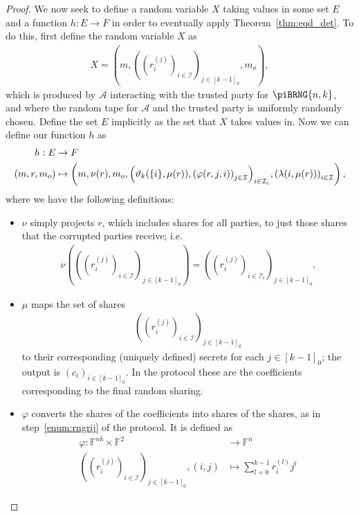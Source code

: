 \documentclass{article}
\newcommand{\seqZ}[1]{\left[#1\right]_0}
\theoremstyle{remark}
\newcommand{\F}{\mathbb{F}}
\begin{document}
\begin{proof}
	We now seek to define a random variable $X$ taking values in some set $E$
	and a function $h: E \to F$ in order to eventually apply
	Theorem~\ref{thm:eqd_det}. To do this, first define the random variable $X$
	as
	\begin{align*}
		X =
		\left(
			m,
			{\left(
				{\left(r_i^{(j)}\right)}_{i \in \mathcal{I}}
			\right)}_{j \in \seqZ{k-1}},
			m_o
		\right),
	\end{align*}
	which is produced by $\mathcal{A}$ interacting with the trusted party for
	$\piBRNG{n,k}$, and where the random tape for $\mathcal{A}$ and the trusted
	party is uniformly randomly chosen. Define the set $E$ implicitly as the
	set that $X$ takes values in. Now we can define our function $h$ as
	\begin{align*}
		\begin{aligned}
			h: E &\to F\\
			\left(
				m,
				r,
				m_o
			\right)
			&\mapsto
			\left(
				m,
				\nu(r),
				m_o,
				{\left(
					\vartheta_{k}(\{i\}, \mu(r)),
					{\left(\varphi(r, j, i)\right)}_{j \in \mathcal{I}}
				\right)}_{i \in \mathcal{I}_c},
				{\left(\lambda(i, \mu(r))\right)}_{i \in \mathcal{I}}
			\right),
		\end{aligned}
	\end{align*}
	where we have the following definitions:
	\begin{itemize}
		\item $\nu$ simply projects $r$, which includes shares for all parties,
			to just those shares that the corrupted parties receive; i.e.
			\begin{align*}
				\nu
				\left(
					{\left(
						{\left(
							r_i^{(j)}
						\right)}_{i \in \mathcal{I}}
					\right)}_{j \in \seqZ{k-1}}
				\right)
				=
				{\left(
					{\left(r_i^{(j)}\right)}_{i \in \mathcal{I}_c}
				\right)}_{j \in \seqZ{k-1}}.
			\end{align*}

		\item $\mu$ maps the set of shares
			\begin{align*}
				{\left(
					{\left(r_i^{(j)}\right)}_{i \in \mathcal{I}}
				\right)}_{j \in \seqZ{k-1}}
			\end{align*}
			to their corresponding (uniquely defined) secrets for each $j \in
			\seqZ{k-1}$; the output is ${(c_i)}_{i \in \seqZ{k-1}}$. In the
			protocol these are the coefficients corresponding to the final
			random sharing.

		\item $\varphi$ converts the shares of the coefficients into shares of
			the shares, as in step~\ref{enum:rngrij} of the protocol. It is
			defined as
			\begin{align*}
				\varphi: \F^{nk} \times \F^2
				&\to
				\F^n\\
				{\left(
					{\left(
						r_i^{(j)}
					\right)}_{i \in \mathcal{I}}
				\right)}_{j \in \seqZ{k-1}},
				(i, j)
				&\mapsto
				\sum_{l=0}^{k-1} r_i^{(l)} j^l
			\end{align*}


\end{itemize}
\end{proof}
\end{document}

